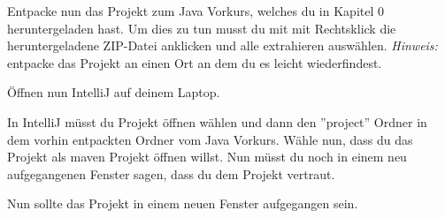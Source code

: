 
\label{ex1}
Entpacke nun das Projekt zum Java Vorkurs, welches du in Kapitel 0 heruntergeladen hast. Um dies zu tun musst du mit mit Rechtsklick die heruntergeladene ZIP-Datei anklicken und alle extrahieren auswählen. \textit{Hinweis:} entpacke das Projekt an einen Ort an dem du es leicht wiederfindest.\newline

Öffnen nun IntelliJ auf deinem Laptop.\newline

In IntelliJ müsst du Projekt öffnen wählen und dann den ''project'' Ordner in dem vorhin entpackten Ordner vom Java Vorkurs. Wähle nun, dass du das Projekt als maven Projekt öffnen willst. Nun müsst du noch in einem neu aufgegangenen Fenster sagen, dass du dem Projekt vertraut.\newline

Nun sollte das Projekt in einem neuen Fenster aufgegangen sein.